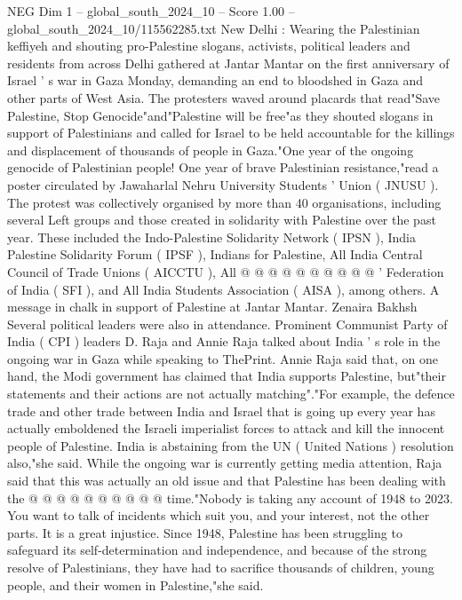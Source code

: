 \begin{textsample}{NEG Dim 1 – global\_south\_2024\_10 – Score 1.00 – global\_south\_2024\_10/115562285.txt}  \label{ex:f1_neg_431}
New Delhi : Wearing the Palestinian keffiyeh and shouting pro-Palestine slogans, activists, political leaders and residents from across Delhi gathered at Jantar Mantar on the first anniversary of Israel ' s war in Gaza Monday, demanding an end to bloodshed in Gaza and other parts of West Asia.
The protesters waved around placards that read"Save Palestine, Stop Genocide"and"Palestine will be free"as they shouted slogans in support of Palestinians and called for Israel to be held accountable for the killings and displacement of thousands of people in Gaza."One year of the ongoing genocide of Palestinian people!
One year of brave Palestinian resistance,"read a poster circulated by Jawaharlal Nehru University Students ' Union ( JNUSU ).
The protest was collectively organised by more than 40 organisations, including several Left groups and those created in solidarity with Palestine over the past year.
These included the Indo-Palestine Solidarity Network ( IPSN ), India Palestine Solidarity Forum ( IPSF ), Indians for Palestine, All India Central Council of Trade Unions ( AICCTU ), All @ @ @ @ @ @ @ @ @ @ ' Federation of India ( SFI ), and All India Students Association ( AISA ), among others.
A message in chalk in support of Palestine at Jantar Mantar.
Zenaira Bakhsh Several political leaders were also in attendance.
Prominent Communist Party of India ( CPI ) leaders D.
Raja and Annie Raja talked about India ' s role in the ongoing war in Gaza while speaking to ThePrint.
Annie Raja said that, on one hand, the Modi government has claimed that India supports Palestine, but"their statements and their actions are not actually matching"."For example, the defence trade and other trade between India and Israel that is going up every year has actually emboldened the Israeli imperialist forces to attack and kill the innocent people of Palestine.
India is abstaining from the UN ( United Nations ) resolution also,"she said.
While the ongoing war is currently getting media attention, Raja said that this was actually an old issue and that Palestine has been dealing with the @ @ @ @ @ @ @ @ @ @ time."Nobody is taking any account of 1948 to 2023.
You want to talk of incidents which suit you, and your interest, not the other parts.
It is a great injustice.
Since 1948, Palestine has been struggling to safeguard its self-determination and independence, and because of the strong resolve of Palestinians, they have had to sacrifice thousands of children, young people, and their women in Palestine,"she said.

\end{textsample}
